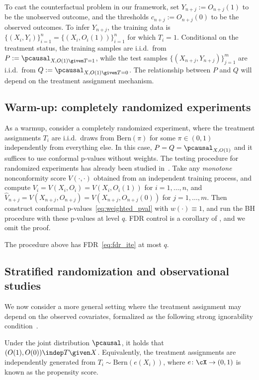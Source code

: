 To cast the counterfactual problem in our framework,
set $Y_{n+j}:= O_{n+j}(1)$ to be the unobserved outcome, and the
thresholds $c_{n+j} := O_{n+j}(0)$ to be the observed outcomes.
To infer $Y_{n+j}$, the training data is
$\{(X_i,Y_i )\}_{i=1}^n = \{(X_i,O_i(1))\}_{i=1}^n$
for which $T_i=1$.
Conditional on the treatment status, the training samples are i.i.d.~from
$P:=\pcausal_{X,O(1)\given T=1}$,
while the test samples $\{(X_{n+j},Y_{n+j})\}_{j=1}^m$ are i.i.d.~from
$Q:=\pcausal_{X,O(1)\given T=0}$.
The relationship between $P$ and $Q$ will depend on the treatment assignment
mechanism.


\subsection{Warm-up: completely randomized experiments}

As a warmup, consider a completely randomized experiment, where the
treatment assignments $T_i$ are i.i.d.~draws from $\textrm{Bern}(\pi)$
for some $\pi\in(0,1)$ independently from everything else.
In this case, $P =Q = \pcausal_{X,O(1)}$ and
it suffices to use conformal p-values without weights.
%
The
testing procedure
for randomized experiments has already been studied in~\cite{jin2022selection}.
Take any \emph{monotone} nonconformity score $V(\cdot,\cdot)$ obtained
from an independent training process,
and compute $V_i = V(X_i,O_i) = V(X_i,O_i(1))$ for $i=1,\dots,n$,
and $\hat{V}_{n+j} =V(X_{n+j},O_{n+j})= V(X_{n+j},O_{n+j}(0))$ for $j=1,\dots,m$.
Then construct conformal p-values~\eqref{eq:weighted_pval} with $w(\cdot)\equiv 1$,
and run the BH procedure with  these p-values at level $q$.
FDR control is a corollary of \cite[Theorem 2.3]{jin2022selection}, and we omit the proof.

\begin{corollary}\label{cor:ite_randomized}
The procedure above has FDR~\eqref{eq:fdr_ite} at most  $q$.
\end{corollary}


\subsection{Stratified randomization and observational studies}

We now consider a more general setting where the treatment assignment
may depend on the observed covariates, formalized
as the following strong ignorability condition~\cite{imbens2015causal}.

\begin{assumption}\label{assump:ignor}
Under the joint distribution $\pcausal$, it holds that
$(O(1),O(0)) \indep T \given X$. Equivalently,
the treatment assignments are independently
generated from $T_i\sim \textrm{Bern}(e(X_i))$,
where $e\colon \cX\to (0,1)$ is known as the propensity score.
\end{assumption}

